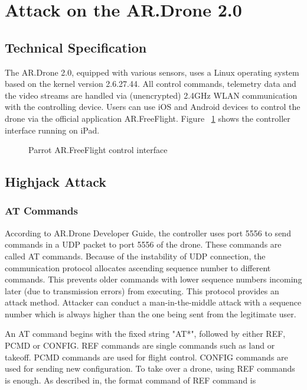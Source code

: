 \documentclass{acm_proc_article-sp}
\begin{document}
\section{Attack on the AR.Drone 2.0}

\subsection{Technical Specification}
The AR.Drone 2.0, equipped with various sensors, uses a Linux operating system based on the kernel version 2.6.27.44. All control commands, telemetry data and the video streams are handled via (unencrypted) 2.4GHz WLAN communication with the controlling device. Users can use iOS and Android devices to control the drone via the official application AR.FreeFlight. Figure ~\ref{iPad} shows the controller interface running on iPad.

\begin{figure}
\centering
\label{iPad}
\caption{Parrot AR.FreeFlight control interface}
\end{figure}


\subsection{Highjack Attack}

\subsubsection{AT Commands}
According to AR.Drone Developer Guide\cite{dev:guide}, the controller uses port 5556 to send commands in a UDP packet to port 5556 of the drone. These commands are called AT commands. Because of the instability of UDP connection, the communication protocol allocates ascending sequence number to different commands. This prevents older commands with lower sequence numbers incoming later (due to transmission errors) from executing\cite{hack:secure}. This protocol provides an attack method. Attacker can conduct a man-in-the-middle attack with a sequence number which is always higher than the one being sent from the legitimate user.

An AT command begins with the fixed string "AT*", followed by either REF, PCMD or CONFIG. REF commands are single commands such as land or takeoff. PCMD commands are used for flight control. CONFIG commands are used for sending new configuration. To take over a drone, using REF commands is enough. As described in\cite{dev:guide}, the format command of REF command is 
\end{document}
